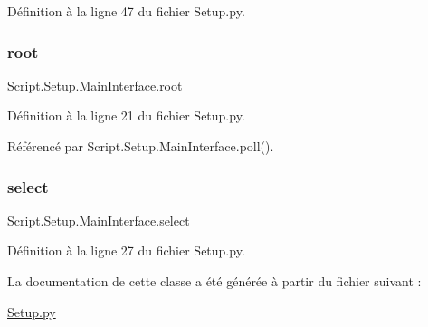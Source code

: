 Définition à la ligne 47 du fichier Setup.\+py.

\mbox{\label{classScript_1_1Setup_1_1MainInterface_a9436309be16e61a1527bdb8a62514de4}} 
\subsubsection{\texorpdfstring{root}{root}}
{\footnotesize\ttfamily Script.\+Setup.\+Main\+Interface.\+root}



Définition à la ligne 21 du fichier Setup.\+py.



Référencé par Script.\+Setup.\+Main\+Interface.\+poll().

\mbox{\label{classScript_1_1Setup_1_1MainInterface_a55c2c685b44f6ece1c4a9ea1eb8db30c}} 
\subsubsection{\texorpdfstring{select}{select}}
{\footnotesize\ttfamily Script.\+Setup.\+Main\+Interface.\+select}



Définition à la ligne 27 du fichier Setup.\+py.



La documentation de cette classe a été générée à partir du fichier suivant \+:\begin{DoxyCompactItemize}
\item 
\hyperlink{Setup_8py}{Setup.\+py}\end{DoxyCompactItemize}
